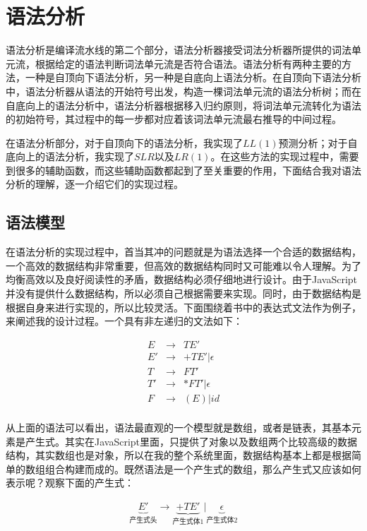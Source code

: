 \chapter{语法分析}

语法分析是编译流水线的第二个部分，语法分析器接受词法分析器所提供的词法单元流，根据给定的语法判断词法单元流是否符合语法。语法分析有两种主要的方法，一种是自顶向下语法分析，另一种是自底向上语法分析。在自顶向下语法分析中，语法分析器从语法的开始符号出发，构造一棵词法单元流的语法分析树；而在自底向上的语法分析中，语法分析器根据移入归约原则，将词法单元流转化为语法的初始符号，其过程中的每一步都对应着该词法单元流最右推导的中间过程。

在语法分析部分，对于自顶向下的语法分析，我实现了$LL(1)$预测分析；对于自底向上的语法分析，我实现了$SLR$以及$LR(1)$。在这些方法的实现过程中，需要到很多的辅助函数，而这些辅助函数都起到了至关重要的作用，下面结合我对语法分析的理解，逐一介绍它们的实现过程。

\section{语法模型}

在语法分析的实现过程中，首当其冲的问题就是为语法选择一个合适的数据结构，一个高效的数据结构非常重要，但高效的数据结构同时又可能难以令人理解。为了均衡高效以及良好阅读性的矛盾，数据结构必须仔细地进行设计。由于JavaScript并没有提供什么数据结构，所以必须自己根据需要来实现。同时，由于数据结构是根据自身来进行实现的，所以比较灵活。下面围绕着书中的表达式文法作为例子，来阐述我的设计过程。一个具有非左递归的文法如下：

\begin{eqnarray*}
    E  & \rightarrow & TE'               \\
    E' & \rightarrow & +TE' | \epsilon   \\
    T  & \rightarrow & FT'               \\
    T' & \rightarrow & *FT' | \epsilon   \\
    F  & \rightarrow & (E) | id          \\
\end{eqnarray*}

从上面的语法可以看出，语法最直观的一个模型就是数组，或者是链表，其基本元素是产生式。其实在JavaScript里面，只提供了对象以及数组两个比较高级的数据结构，其实数组也是对象，所以在我的整个系统里面，数据结构基本上都是根据简单的数组组合构建而成的。既然语法是一个产生式的数组，那么产生式又应该如何表示呢？观察下面的产生式：

\begin{eqnarray*}
    \underbrace{E'}_\text{产生式头} \rightarrow 
    \underbrace{+TE'}_\text{产生式体1} |
    \underbrace{\epsilon}_\text{产生式体2}
\end{eqnarray*}

